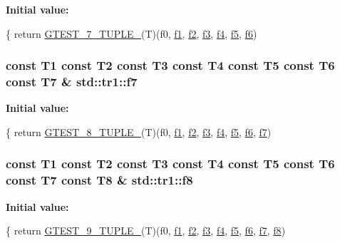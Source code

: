 {\bfseries Initial value\+:}
\begin{DoxyCode}
\{
  \textcolor{keywordflow}{return} \hyperlink{gtest-tuple_8h_a8987baf82ee028d1d778447413a02c0c}{GTEST\_7\_TUPLE\_}(T)(f0, \hyperlink{namespacestd_1_1tr1_a9c0fa65b105f8e2f58ba59ecf75fd000}{f1}, \hyperlink{namespacestd_1_1tr1_a87dd9e009868361317f587126dba63d4}{f2}, \hyperlink{namespacestd_1_1tr1_a0f7c3b47d27d42d82d1a333ea420ce4e}{f3}, \hyperlink{namespacestd_1_1tr1_adc796e02b7385d526aff708189564f67}{f4}, \hyperlink{namespacestd_1_1tr1_a9c1eb66b2b2fa321942af95405232a0d}{f5}, \hyperlink{namespacestd_1_1tr1_a6b62f32e1e3e21bceb94eb46c4cbfd56}{f6})
\end{DoxyCode}
\hypertarget{namespacestd_1_1tr1_a2185f3a1c07f2df072c39cb91ffa89a4}{
\subsubsection[{f7}]{\setlength{\rightskip}{0pt plus 5cm}const T1 const T2 const T3 const T4 const T5 const T6 const T7 \& std\+::tr1\+::f7}}\label{namespacestd_1_1tr1_a2185f3a1c07f2df072c39cb91ffa89a4}
{\bfseries Initial value\+:}
\begin{DoxyCode}
\{
  \textcolor{keywordflow}{return} \hyperlink{gtest-tuple_8h_a2bc36d1a71a551e6cda2ac5504fb7ce3}{GTEST\_8\_TUPLE\_}(T)(f0, \hyperlink{namespacestd_1_1tr1_a9c0fa65b105f8e2f58ba59ecf75fd000}{f1}, \hyperlink{namespacestd_1_1tr1_a87dd9e009868361317f587126dba63d4}{f2}, \hyperlink{namespacestd_1_1tr1_a0f7c3b47d27d42d82d1a333ea420ce4e}{f3}, \hyperlink{namespacestd_1_1tr1_adc796e02b7385d526aff708189564f67}{f4}, \hyperlink{namespacestd_1_1tr1_a9c1eb66b2b2fa321942af95405232a0d}{f5}, \hyperlink{namespacestd_1_1tr1_a6b62f32e1e3e21bceb94eb46c4cbfd56}{f6}, 
      \hyperlink{namespacestd_1_1tr1_a2185f3a1c07f2df072c39cb91ffa89a4}{f7})
\end{DoxyCode}
\hypertarget{namespacestd_1_1tr1_ab998afa41cea8d6d26d7e4288b0bf974}{
\subsubsection[{f8}]{\setlength{\rightskip}{0pt plus 5cm}const T1 const T2 const T3 const T4 const T5 const T6 const T7 const T8 \& std\+::tr1\+::f8}}\label{namespacestd_1_1tr1_ab998afa41cea8d6d26d7e4288b0bf974}
{\bfseries Initial value\+:}
\begin{DoxyCode}
\{
  \textcolor{keywordflow}{return} \hyperlink{gtest-tuple_8h_a1a81c17bfe3cdceb4d56b15985a44a7e}{GTEST\_9\_TUPLE\_}(T)(f0, \hyperlink{namespacestd_1_1tr1_a9c0fa65b105f8e2f58ba59ecf75fd000}{f1}, \hyperlink{namespacestd_1_1tr1_a87dd9e009868361317f587126dba63d4}{f2}, \hyperlink{namespacestd_1_1tr1_a0f7c3b47d27d42d82d1a333ea420ce4e}{f3}, \hyperlink{namespacestd_1_1tr1_adc796e02b7385d526aff708189564f67}{f4}, \hyperlink{namespacestd_1_1tr1_a9c1eb66b2b2fa321942af95405232a0d}{f5}, \hyperlink{namespacestd_1_1tr1_a6b62f32e1e3e21bceb94eb46c4cbfd56}{f6}, 
      \hyperlink{namespacestd_1_1tr1_a2185f3a1c07f2df072c39cb91ffa89a4}{f7}, \hyperlink{namespacestd_1_1tr1_ab998afa41cea8d6d26d7e4288b0bf974}{f8})
\end{DoxyCode}
